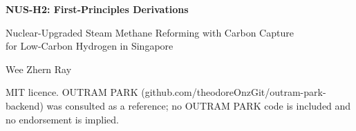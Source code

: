 \documentclass[11pt,a4paper]{article}
\begin{document}
\hypersetup{pageanchor=false}
\begin{titlepage}
\centering
\vspace*{3cm}
{\LARGE\bfseries NUS-H2: First-Principles Derivations\par}
\vspace{0.8cm}
{\large Nuclear-Upgraded Steam Methane Reforming with Carbon Capture\\
for Low-Carbon Hydrogen in Singapore\par}
\vspace{1.5cm}
{\large Wee Zhern Ray\par}
\vspace{1.0cm}
{\normalsize MIT licence. OUTRAM PARK (github.com/theodoreOnzGit/outram-park-backend) was consulted as a reference; no OUTRAM PARK code is included and no endorsement is implied.\par}
\vspace{1.5cm}
\begin{minipage}{0.86\textwidth}\centering\small\itshape \vNumberBasis\end{minipage}
\vfill
\end{titlepage}
\hypersetup{pageanchor=true}

\tableofcontents
\clearpage































\clearpage

\end{document}
